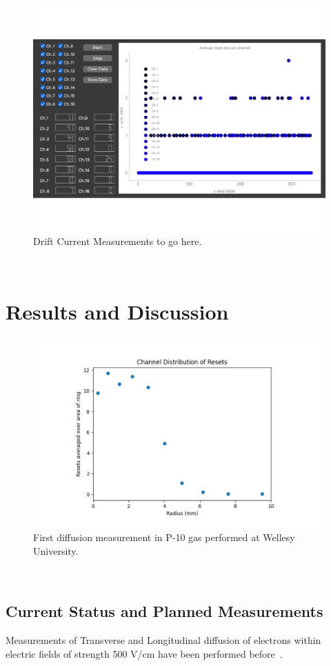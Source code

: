 \begin{figure}[]
\centering
\includegraphics[width=\textwidth]{images/SAQ_gui_resets.pdf}
\caption{Drift Current Measurements to go here.}
\end{figure}~\label{fig:saq_drift_gui}

\section{Results and Discussion}

\begin{figure}[]
\centering
\includegraphics[width=\textwidth]{images/SAQ_first_diffusion_measurement.pdf}
\caption{First diffusion measurement in P-10 gas performed at Wellesy University.}
\end{figure}~\label{fig:saq_first_diffusion_measurement}

\subsection{Current Status and Planned Measurements}

Measurements of Transverse and Longitudinal diffusion of electrons within electric fields of strength 500 V/cm have been performed before~\citep{lar_diffusion_measurement_LI2016160}.
